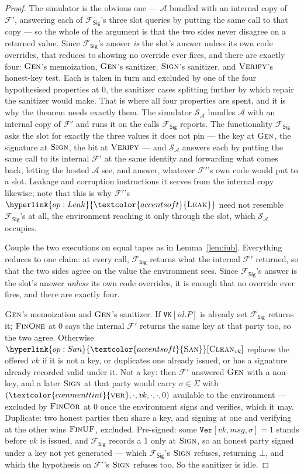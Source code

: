 \documentclass[10pt,oneside,openany]{book}
\newcommand{\F}{\mathcal{F}}
\newcommand{\Adv}{\mathcal{A}}
\newcommand{\Sim}{\mathcal{S}}
\newcommand{\op}[1]{\textnormal{\textsc{#1}}}
\newcommand{\opl}[1]{\hyperlink{op:#1}{\textcolor{accentsoft}{\op{#1}}}}
\newcommand{\id}{id}
\newcommand{\atom}[1]{\textcolor{commenttint}{\op{#1}}}
\newcommand{\Fsig}{\mathcal{F}_{\mathsf{Sig}}}
\newcommand{\vk}{\mathit{vk}}
\newcommand{\msg}{\mathit{msg}}
\newcommand{\Sigs}{\Sigma}
\newcommand{\none}{\bot}
\newcommand{\San}{\opl{San}}
\newcommand{\Clean}{\op{Clean}}
\newcommand{\V}[1]{\mathtt{#1}}
\theoremstyle{accentdef}
\theoremstyle{accentplain}
\begin{document}
\begin{proof}
The simulator is the obvious one --- $\Adv$ bundled with an internal copy of $\F'$, answering each
of $\Fsig$'s three slot queries by putting the same call to that copy --- so the whole of the
argument is that the two sides never disagree on a returned value. Since $\Fsig$'s answer \emph{is}
the slot's answer unless its own code overrides, that reduces to showing no override ever fires,
and there are exactly four: $\op{Gen}$'s memoization, $\op{Gen}$'s sanitizer, $\op{Sign}$'s
sanitizer, and $\op{Verify}$'s honest-key test. Each is taken in turn and excluded by one of the
four hypothesised properties at $0$, the sanitizer cases splitting further by which repair the
sanitizer would make. That is where all four properties are spent, and it is why the theorem needs
exactly them.
The simulator $\Sim_{\Adv}$ bundles $\Adv$ with an internal copy of $\F'$ and runs it on the calls $\Fsig$
reports. The functionality $\Fsig$ asks the slot for exactly the three values it does not pin --- the key at
$\op{Gen}$, the signature at $\op{Sign}$, the bit at $\op{Verify}$ --- and $\Sim_{\Adv}$ answers
each by putting the same call to its internal $\F'$ at the same identity and forwarding what comes
back, letting the hosted $\Adv$ see, and answer, whatever $\F'$'s own code would put to a slot.
Leakage and corruption instructions it serves from the internal copy likewise; note that this is
why $\F'$'s $\opl{Leak}$ need not resemble $\Fsig$'s at all, the environment reaching it only
through the slot, which $\Sim_{\Adv}$ occupies.

Couple the two executions on equal tapes as in Lemma~\ref{lem:iub}. Everything reduces to one
claim: at every call, $\Fsig$ returns what the internal $\F'$ returned, so that the two sides
agree on the value the environment sees. Since $\Fsig$'s answer is the slot's answer \emph{unless}
its own code overrides, it is enough that no override ever fires, and there are exactly four.

$\op{Gen}$'s memoization and $\op{Gen}$'s sanitizer. If $\V{VK}[\id.P]$ is already set $\Fsig$
returns it; $\op{FinOne}$ at $0$ says the internal $\F'$ returns the same key at that party too,
so the two agree. Otherwise $\San[\Clean_{\vk}]$ replaces the offered $\vk$ if it is not a key, or
duplicates one already issued, or has a signature already recorded valid under it. Not a key: then
$\F'$ answered $\op{Gen}$ with a non-key, and a later $\op{Sign}$ at that party would carry
$\sigma \in \Sigs$ with $(\atom{ver},\cdot,\vk,\cdot,\cdot,0)$ available to the environment ---
excluded by $\op{FinCor}$ at $0$ once the environment signs and verifies, which it may. Duplicate:
two honest parties then share a key, and signing at one and verifying at the other wins
$\op{FinUF}$, excluded. Pre-signed: some $\V{Ver}[\vk,\msg,\sigma] = 1$ stands before $\vk$ is
issued, and $\Fsig$ records a $1$ only at $\op{Sign}$, so an honest party signed under a key not
yet generated --- which $\Fsig$'s $\op{Sign}$ refuses, returning $\none$, and which the
hypothesis on $\F'$'s $\op{Sign}$ refuses too. So the sanitizer is idle.


\end{proof}
\end{document}

